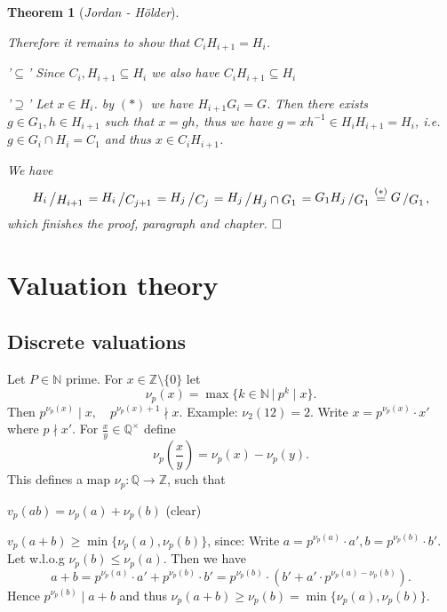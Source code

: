 \documentclass[11pt]{book}
\newtheorem{theorem}{Theorem}[section]
\theoremstyle{nonumberbreak}
\newenvironment{pr}[1][]{\ifthenelse{\equal{#1}{}}{\proof}{\proof[#1]}\rm}{\endproof}
\newenvironment{ex}[1][]{\ifthenelse{\equal{#1}{}}{\example}{\example[#1]}\rm}{\endexample}
\newcommand{\slant}[2]{{\raisebox{.1em}{$#1$}\left/\raisebox{-.1em}{$#2$}\right.}}
\begin{document}
\begin{spacing}{1.3}
\begin{theorem}[\rm \it Jordan - Hölder]
\begin{pr}
\begin{compactenum}
\begin{compactenum}
\begin{compactenum}
Therefore it remains to show that $C_i H_{i+1}=H_i$.
\begin{compactitem}
\item['$\subseteq$'] Since $C_i, H_{i+1} \subseteq H_i$ we also have $C_i H_{i+1} \subseteq H_i$
\item['$\supseteq$'] Let $x \in H_i$. by $(*)$ we have $H_{i+1}G_i=G$.
Then there exists $g \in G_1, h \in H_{i+1}$ such that $x=gh$, 
thus we have $g=x h^{-1} \in H_i H_{i+1}=H_i$, i.e. $g \in G_i \cap H_{i}=C_1$ and thus $x \in C_i H_{i+1}$.
\end{compactitem}
\end{compactenum}
\item We have 
$$\slant{H_i}{H_{i+1}}= \slant{H_i}{C_{j+1}}=\slant{H_j}{C_j}=\slant{H_j}{H_j \cap G_1} = \slant{G_1 H_j}{G_1}\overset{(*)}{=} \slant{G}{G_1},$$
which finishes the proof, paragraph and chapter. $\hfill \Box$
\end{compactenum}
\end{compactenum}
\end{pr}
\end{theorem}



\chapter{Valuation theory}
\thispagestyle{empty}

\setcounter{section}{6}


\renewcommand*\thesection{§ \arabic{section}\quad}
\section{Discrete valuations}
\renewcommand*\thesection{\arabic{section}}



\begin{ex} %
Let $P \in \mathbb{N}$ prime. For $x \in \mathbb{Z}\setminus \{0\}$ let 
$$\nu_p(x)=\max\{k \in \mathbb{N} \ \big\vert\ p^k \mid x \}.$$
Then $p^{\nu_p(x)} \mid x, \quad p^{\nu_p(x)+1} \nmid x$. Example: $\nu_2(12)=2$.
Write $x=p^{\nu_p(x)} \cdot x'$ where $p \nmid x'$.
For $\frac{x}{y} \in \mathbb{Q}^{\times}$ define
$$\nu_p\left(\frac{x}{y}\right)=\nu_p(x)-\nu_p(y).$$
This defines a map $\nu_p: \mathbb{Q} \longrightarrow \mathbb{Z}$, such that
\begin{compactenum}
\item $v_p(ab)=\nu_p(a)+\nu_p(b)$ (clear)
\item $v_p(a+b) \geqslant \min\{\nu_p(a), \nu_p(b)\}$, since:
Write $a=p^{\nu_p(a)} \cdot a', b=p^{\nu_p(b)}\cdot b'$. Let w.l.o.g $\nu_p(b) \leqslant \nu_p(a)$. Then we have
$$a+b=p^{\nu_p(a)} \cdot a' + p^{\nu_p(b)} \cdot b'=p^{\nu_p(b)} \cdot \left(b'+a' \cdot p^{\nu_p(a)-\nu_p(b)}\right).$$
Hence $p^{\nu_p(b)} \mid a+b$ and thus $\nu_p(a+b) \geqslant \nu_p(b)=\min\{\nu_p(a), \nu_p(b)\}.$
\end{compactenum}
\end{ex}


\end{spacing}
\end{document}
